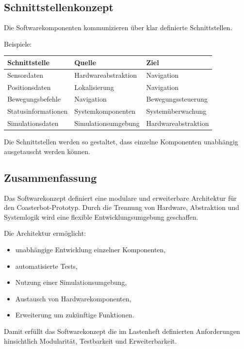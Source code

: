 \documentclass[
  a4paper,
  12pt,
  DIV=12,        %
  parskip=half,  %
  headings=small %
]{scrartcl}
\theoremstyle{definition}
\providecommand{\tightlist}{%
  \setlength{\itemsep}{0pt}\setlength{\parskip}{0pt}}
\theoremstyle{definition}
\begin{document}
\subsection{Schnittstellenkonzept}\label{schnittstellenkonzept}

Die Softwarekomponenten kommunizieren über klar definierte
Schnittstellen.

Beispiele:

\begin{longtable}[]{@{}lll@{}}
\toprule\noalign{}
Schnittstelle & Quelle & Ziel \\
\midrule\noalign{}
\endhead
\bottomrule\noalign{}
\endlastfoot
Sensordaten & Hardwareabstraktion & Navigation \\
Positionsdaten & Lokalisierung & Navigation \\
Bewegungsbefehle & Navigation & Bewegungssteuerung \\
Statusinformationen & Systemkomponenten & Systemüberwachung \\
Simulationsdaten & Simulationsumgebung & Hardwareabstraktion \\
\end{longtable}

Die Schnittstellen werden so gestaltet, dass einzelne Komponenten
unabhängig ausgetauscht werden können.

\subsection{Zusammenfassung}\label{zusammenfassung-2}

Das Softwarekonzept definiert eine modulare und erweiterbare Architektur
für den Coasterbot-Prototyp. Durch die Trennung von Hardware,
Abstraktion und Systemlogik wird eine flexible Entwicklungsumgebung
geschaffen.

Die Architektur ermöglicht:

\begin{itemize}
\tightlist
\item
  unabhängige Entwicklung einzelner Komponenten,
\item
  automatisierte Tests,
\item
  Nutzung einer Simulationsumgebung,
\item
  Austausch von Hardwarekomponenten,
\item
  Erweiterung um zukünftige Funktionen.
\end{itemize}

Damit erfüllt das Softwarekonzept die im Lastenheft definierten
Anforderungen hinsichtlich Modularität, Testbarkeit und Erweiterbarkeit.
\end{document}
